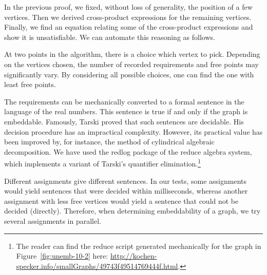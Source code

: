 \documentclass[adraft,copyright,creativecommons]{eptcs}
\newcounter{main}
\theoremstyle{definition}
\theoremstyle{remark}
\begin{document}

In the previous proof, we fixed, without loss of generality, the position
of a few vertices.  Then we derived cross-product expressions for the
remaining vertices.  Finally, we find an equation relating some of
the cross-product expressions and show it is unsatisfiable.
We can automate this reasoning as follows.

\begin{algorithm}
\end{algorithm}
At two points in the algorithm, there is a choice which vertex to pick.
Depending on the vertices chosen, the number of recorded requirements
and free points may significantly vary. By considering all possible choices,
one can find the one with least free points.

The requirements can be mechanically converted
to a formal sentence
in the language of the real numbers.
This sentence is true if and only if the graph is embeddable.
Famously, Tarski proved\cite{tarski}
that such sentences are decidable.
His decision procedure has an impractical complexity.
However, its practical value has been improved
by, for instance, the method of cylindrical algebraic decomposition\cite{qecad}.
We have used the redlog\cite{redlog} package of the reduce algebra
system, which implements a variant of Tarski's quantifier
elimination.\footnote{%
    The reader can find the reduce script generated mechanically
    for the graph in Figure~\ref{fig:unemb-10-2} here:
    \url{http://kochen-specker.info/smallGraphs/49743f49514769444f.html}.  }

Different assignments give different sentences.  In our tests,
some assignments would yield sentences that were decided within milliseconds,
whereas another assignment with less free vertices would
yield a sentence that could not be decided (directly).
Therefore, when determining embeddability of a graph,
we try several assignments in parallel.
\end{document}
